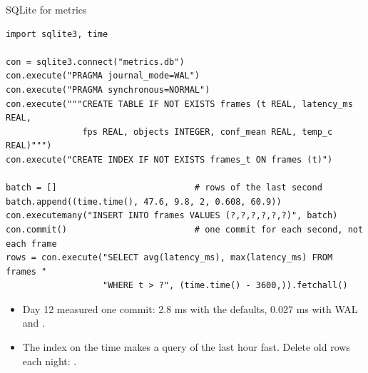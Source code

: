 \begin{frame}[fragile]{SQLite for metrics}
\begin{lstlisting}[style=python, basicstyle=\ttfamily\scriptsize]
import sqlite3, time

con = sqlite3.connect("metrics.db")
con.execute("PRAGMA journal_mode=WAL")
con.execute("PRAGMA synchronous=NORMAL")
con.execute("""CREATE TABLE IF NOT EXISTS frames (t REAL, latency_ms REAL,
               fps REAL, objects INTEGER, conf_mean REAL, temp_c REAL)""")
con.execute("CREATE INDEX IF NOT EXISTS frames_t ON frames (t)")

batch = []                           # rows of the last second
batch.append((time.time(), 47.6, 9.8, 2, 0.608, 60.9))
con.executemany("INSERT INTO frames VALUES (?,?,?,?,?,?)", batch)
con.commit()                         # one commit for each second, not each frame
rows = con.execute("SELECT avg(latency_ms), max(latency_ms) FROM frames "
                   "WHERE t > ?", (time.time() - 3600,)).fetchall()
\end{lstlisting}
  \small
  \begin{itemize}
    \item Day 12 measured one commit: 2.8 ms with the defaults, 0.027 ms
          with WAL and .
    \item The index on the time makes a query of the last hour fast.
          Delete old rows each night: .
  \end{itemize}
\end{frame}

